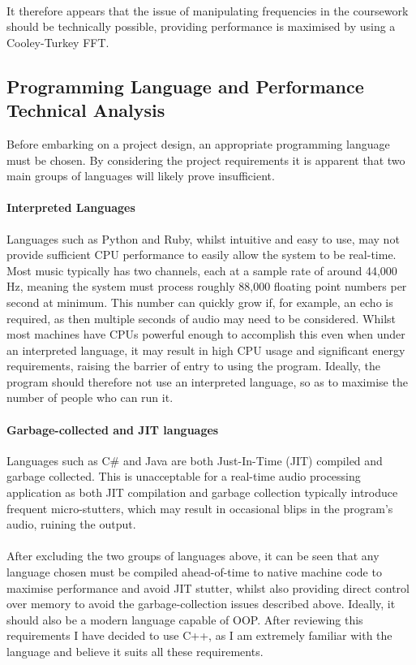 \paragraph{}
It therefore appears that the issue of manipulating frequencies in the coursework should be technically possible, providing performance is maximised by using a Cooley-Turkey FFT.

\pagebreak
\subsection{Programming Language  and Performance Technical Analysis}
Before embarking on a project design, an appropriate programming language must be chosen. By considering the project requirements it is apparent that two main groups of languages will likely prove insufficient.

\paragraph{Interpreted Languages}
Languages such as Python and Ruby, whilst intuitive and easy to use, may not provide sufficient CPU performance to easily allow the system to be real-time. Most music typically has two channels, each at a sample rate of around 44,000 Hz, meaning the system must process roughly 88,000 floating point numbers per second at minimum. This number can quickly grow if, for example, an echo is required, as then multiple seconds of audio may need to be considered. Whilst most machines have CPUs powerful enough to accomplish this even when under an interpreted language, it may result in high CPU usage and significant energy requirements, raising the barrier of entry to using the program. Ideally, the program should therefore not use an interpreted language, so as to maximise the number of people who can run it.

\paragraph{Garbage-collected and JIT languages}
Languages such as C\# and Java are both Just-In-Time  (JIT) compiled and garbage collected.  This is unacceptable for a real-time audio processing application as both JIT compilation and garbage collection typically introduce frequent micro-stutters, which may result in occasional blips in the program's audio, ruining the output.

\paragraph{}
After excluding the two groups of languages above, it can be seen that any language chosen must be compiled ahead-of-time to native machine code to maximise performance and avoid JIT stutter, whilst also providing direct control over memory to avoid the garbage-collection issues described above. Ideally, it should also be a modern language capable of OOP. After reviewing this requirements I have decided to use C++, as I am extremely familiar with the language and believe it suits all these requirements.

